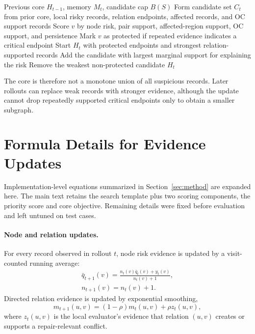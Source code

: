 \documentclass[11pt]{article}
\newcommand{\oc}{OC}
\begin{document}
\begin{algorithm}[H]
\small
\caption{Dynamic core compression}
\label{alg:appendix_dynamic_core}
\begin{algorithmic}[1]
\REQUIRE Previous core $H_{t-1}$, memory $M_t$, candidate cap $B(S)$
\STATE Form candidate set $C_t$ from prior core, local risky records, relation endpoints, affected records, and \oc{} support records
    \STATE Score $v$ by node risk, pair support, affected-region support, \oc{} support, and persistence
    \STATE Mark $v$ as protected if repeated evidence indicates a critical endpoint
\ENDFOR
\STATE Start $H_t$ with protected endpoints and strongest relation-supported records
    \STATE Add the candidate with largest marginal support for explaining the risk
\ENDWHILE
{}
    \STATE Remove the weakest non-protected candidate
\ENDWHILE
\RETURN $H_t$
\end{algorithmic}
\end{algorithm}

The core is therefore not a monotone union of all suspicious records.  Later rollouts can replace weak records with stronger evidence, although the update cannot drop repeatedly supported critical endpoints only to obtain a smaller subgraph.

\FloatBarrier
\section{Formula Details for Evidence Updates}
\label{sec:appendix_formula_details}

Implementation-level equations summarized in Section~\ref{sec:method} are expanded here.  The main text retains the search template plus two scoring components, the priority score and core objective.  Remaining details were fixed before evaluation and left untuned on test cases.

\paragraph{Node and relation updates.}
For every record observed in rollout $t$, node risk evidence is updated by a visit-counted running average:
\begin{equation}
    \begin{aligned}
    \bar{q}_{t+1}(v)=
    \frac{n_t(v)\bar{q}_t(v)+y_t(v)}
    {n_t(v)+1},\\
    n_{t+1}(v)=n_t(v)+1.
    \end{aligned}
    \label{eq:node-update}
\end{equation}
Directed relation evidence is updated by exponential smoothing,
\begin{equation}
    m_{t+1}(u,v)=(1-\rho)m_t(u,v)+\rho z_t(u,v),
    \label{eq:relation-update}
\end{equation}
where $z_t(u,v)$ is the local evaluator's evidence that relation $(u,v)$ creates or supports a repair-relevant conflict.
\end{document}
